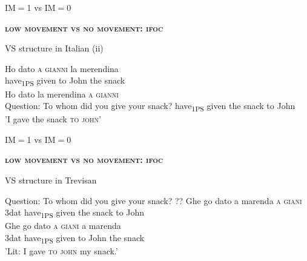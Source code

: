 \documentclass[lesson_slides]{subfiles}
\begin{document}
\begin{frame}[c]{IM$=$1 vs IM$=$0}

    \noindent \textbf{\textsc{low movement vs no movement: ifoc}}

    \begin{exe}
     VS structure in Italian (ii) \pause
        \begin{xlist}
            \ex \gll * Ho dato \textsc{a} \textsc{gianni} la merendina\\
            {} have\textsubscript{1PS} given to John the snack\\  
            \ex \gll Ho dato la merendina \textsc{a} \textsc{gianni}\\ \pause
            \ex Question: To whom did you give your snack?
            have\textsubscript{1PS} given the snack to John\\
            \glt 'I gave the snack \textsc{to} \textsc{john}'
        \end{xlist}
    \end{exe}

\end{frame}
\begin{frame}[c]{IM$=$1 vs IM$=$0}

    \noindent \textbf{\textsc{low movement vs no movement: ifoc}}

    \begin{exe}
        \ex VS structure in Trevisan \pause
            \begin{xlist}
                \ex Question: To whom did you give your snack? \pause
                \ex \gll ?? Ghe go dato a marenda \textsc{a} \textsc{giani}\\
                {} 3dat have\textsubscript{1PS} given the snack to John\\
                \ex \gll Ghe go dato \textsc{a} \textsc{giani} a marenda\\
                3dat have\textsubscript{1PS} given to John the snack\\
                \glt 'Lit: I gave \textsc{to} \textsc{john} my snack.'
            \end{xlist}
    \end{exe}

\end{frame}
\end{document}

